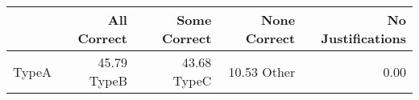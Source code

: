 \begin{tabular}{lrrrr}
\toprule
 & All Correct & Some Correct & None Correct & No Justifications \\
\midrule
TypeA & 45.79%
TypeB & 43.68%
TypeC & 10.53%
Other & 0.00%
\bottomrule
\end{tabular}

